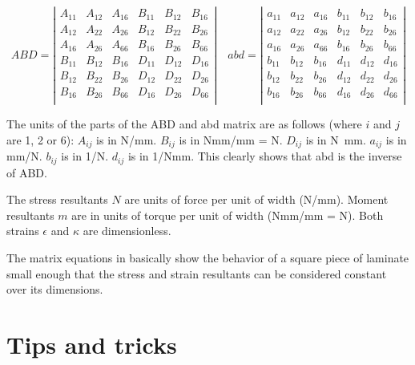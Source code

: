 \documentclass[a4paper,landscape,oneside,11pt,twocolumn]{memoir}
\begin{document}
\[
    ABD = \left|\begin{array}{cccccc}
        A_{11} & A_{12} & A_{16} & B_{11} & B_{12} & B_{16}\\
        A_{12} & A_{22} & A_{26} & B_{12} & B_{22} & B_{26}\\
        A_{16} & A_{26} & A_{66} & B_{16} & B_{26} & B_{66}\\
        B_{11} & B_{12} & B_{16} & D_{11} & D_{12} & D_{16}\\
        B_{12} & B_{22} & B_{26} & D_{12} & D_{22} & D_{26}\\
        B_{16} & B_{26} & B_{66} & D_{16} & D_{26} & D_{66}\\
    \end{array}\right|\quad
    abd = \left|\begin{array}{cccccc}
        a_{11} & a_{12} & a_{16} & b_{11} & b_{12} & b_{16}\\
        a_{12} & a_{22} & a_{26} & b_{12} & b_{22} & b_{26}\\
        a_{16} & a_{26} & a_{66} & b_{16} & b_{26} & b_{66}\\
        b_{11} & b_{12} & b_{16} & d_{11} & d_{12} & d_{16}\\
        b_{12} & b_{22} & b_{26} & d_{12} & d_{22} & d_{26}\\
        b_{16} & b_{26} & b_{66} & d_{16} & d_{26} & d_{66}\\
    \end{array}\right|
\]

The units of the parts of the ABD and abd matrix are as follows (where $i$ and
$j$ are 1, 2 or 6): $A_{ij}$ is in \si{N/mm}. $B_{ij}$ is in \si{Nmm/mm}
= \si{N}.  $D_{ij}$ is in \si{N.mm}.  $a_{ij}$ is in \si{mm/N}.  $b_{ij}$ is
in \si{1/N}.  $d_{ij}$ is in \si{1/Nmm}. This clearly shows that abd is the
inverse of ABD.

The stress resultants $N$ are units of force per unit of width (\si{N/mm}).
Moment resultants $m$ are in units of torque per unit of width (\si{Nmm/mm}
= \si{N}). Both strains $\epsilon$ and $\kappa$ are dimensionless.

The matrix equations in  basically show the
behavior of a square piece of laminate small enough that the stress and strain
resultants can be considered constant over its dimensions.




\chapter{Tips and tricks} %
\end{document}
